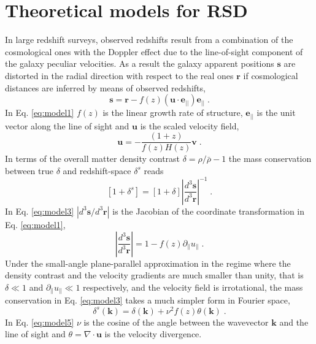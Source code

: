 \documentclass[longauth]{aa}
\def\({\left(}
\def\){\right)}
\def\[{\left[}
\def\]{\right]}
\begin{document}
\section{Theoretical models for RSD}	\label{sec:model}	 							%

In large redshift surveys, observed redshifts result from a combination of the cosmological ones with the Doppler effect due to the line-of-sight component of the galaxy peculiar velocities. As a result the galaxy apparent positions $\mathbf{s}$ are distorted in the radial direction with respect to the real ones $\mathbf{r}$ if cosmological distances are inferred by means of observed redshifts,
	\begin{equation}
		\mathbf{s} = \mathbf{r}-f\(z\)\(\mathbf{u}\cdot\mathbf{e}_{||}\)\mathbf{e}_{||}\; .									\label{eq:model1}
	\end{equation}
In Eq. \eqref{eq:model1} $f(z)$ is the linear growth rate of structure, $\mathbf{e}_{||}$ is the unit vector along the line of sight and $\mathbf{u}$ is the scaled velocity field,
	\begin{equation}
		\mathbf{u} = -\frac{\(1+z\)}{f\(z\)H\(z\)}\mathbf{v}\; .																\label{eq:model2}
	\end{equation}
In terms of the overall matter density contrast $\delta=\rho/\bar{\rho}-1$ the mass conservation between true $\delta$ and redshift-space $\delta^s$ reads
 	\begin{equation}
 		\[1+\delta^s\]=\[1+\delta\]\left|\frac{d^3\mathbf{s}}{d^3\mathbf{r}}\right|^{-1}\; .									\label{eq:model3}
 	\end{equation}
In Eq. \eqref{eq:model3} $\left|d^3\mathbf{s}/d^3\mathbf{r}\right|$ is the Jacobian of the coordinate transformation in Eq. \eqref{eq:model1},
	\begin{equation}
		\left|\frac{d^3\mathbf{s}}{d^3\mathbf{r}}\right| = 1-f\(z\)\partial_{\|}u_{\|}\; .										\label{eq:model4}
	\end{equation}
Under the small-angle plane-parallel approximation in the regime where the density contrast and the velocity gradients are much smaller than unity, that is $\delta\ll 1$ and $\partial_\|u_\|\ll 1$ respectively, and the velocity field is irrotational, the mass conservation in Eq. \eqref{eq:model3} takes a much simpler form in Fourier space,
	\begin{equation}
		\delta^s\(\mathbf{k}\)=\delta\(\mathbf{k}\)+\nu^2f\(z\)\theta\(\mathbf{k}\)\; .										\label{eq:model5}
	\end{equation}
In Eq. \eqref{eq:model5} $\nu$ is the cosine of the angle between the wavevector $\mathbf{k}$ and the line of sight and $\theta=\nabla\cdot\mathbf{u}$ is the velocity divergence.
\end{document}
